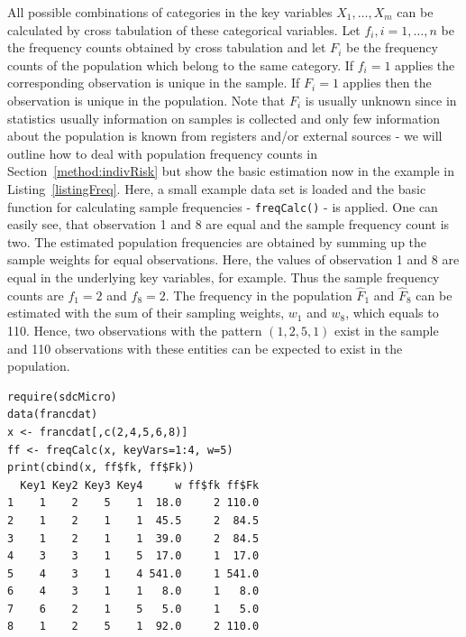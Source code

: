 \documentclass[12pt]{article}
\begin{document}
All possible combinations of categories in the key variables 
$X_1, \ldots, X_m$ can be calculated by cross tabulation of these categorical
variables. Let $f_i, i=1,\ldots,n$ be the 
frequency counts obtained by cross
tabulation and let $F_i$ be the frequency counts of
the population which belong to the same category. If $f_i = 1$ applies 
the corresponding observation is  unique in the
sample. If $F_i = 1$ applies then the observation is unique in the population.
Note that $F_i$ is usually unknown since in statistics usually information
on samples is collected and only few information about the population is
known from registers and/or external sources - we will outline how to deal with
population frequency counts in Section~\ref{method:indivRisk} but show the basic
estimation now in the example in Listing~\ref{listingFreq}.
Here, a small example data set is loaded and the basic  
function for calculating sample frequencies  - \lstinline{freqCalc()} - is applied.
One can easily see, that observation 1 and 8 are equal and the sample frequency count is two.
The estimated population frequencies are obtained by 
summing up the sample weights for equal observations.
Here, the values of observation 1 and
8 are equal in the underlying key variables, for example. Thus the sample frequency 
counts are $f_1=2$ and
$f_8=2$. The frequency in the population $\hat{F}_1$ and $\hat{F}_8$ can
be estimated with the sum of their sampling weights, $w_1$ and $w_8$, which
equals to 110. Hence, two observations with the pattern $(1,2,5,1)$ exist in the
sample and 110 observations with these entities can be expected to exist in the
population.


\begin{lstlisting}[captionpos=b, caption={Example for sample and estimated population frequency counts.}, label=listingFreq]
require(sdcMicro)
data(francdat)
x <- francdat[,c(2,4,5,6,8)]
ff <- freqCalc(x, keyVars=1:4, w=5) 
print(cbind(x, ff$fk, ff$Fk))
  Key1 Key2 Key3 Key4     w ff$fk ff$Fk
1    1    2    5    1  18.0     2 110.0
2    1    2    1    1  45.5     2  84.5
3    1    2    1    1  39.0     2  84.5
4    3    3    1    5  17.0     1  17.0
5    4    3    1    4 541.0     1 541.0
6    4    3    1    1   8.0     1   8.0
7    6    2    1    5   5.0     1   5.0
8    1    2    5    1  92.0     2 110.0
\end{lstlisting}
\end{document}
